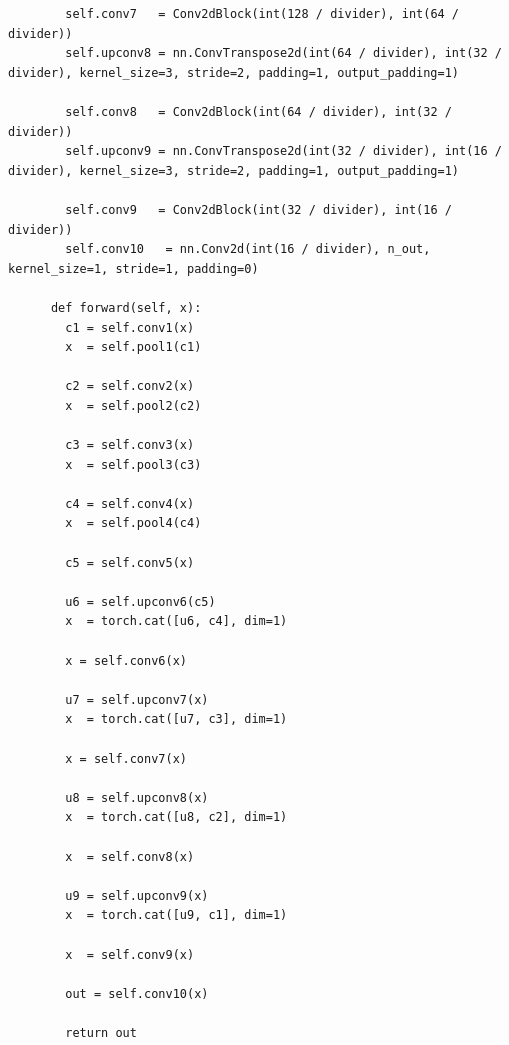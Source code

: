 \begin{longlisting}
\begin{verbatim}
        self.conv7   = Conv2dBlock(int(128 / divider), int(64 / divider))
        self.upconv8 = nn.ConvTranspose2d(int(64 / divider), int(32 / divider), kernel_size=3, stride=2, padding=1, output_padding=1)

        self.conv8   = Conv2dBlock(int(64 / divider), int(32 / divider))
        self.upconv9 = nn.ConvTranspose2d(int(32 / divider), int(16 / divider), kernel_size=3, stride=2, padding=1, output_padding=1)

        self.conv9   = Conv2dBlock(int(32 / divider), int(16 / divider))
        self.conv10   = nn.Conv2d(int(16 / divider), n_out, kernel_size=1, stride=1, padding=0)

      def forward(self, x):
        c1 = self.conv1(x)
        x  = self.pool1(c1)

        c2 = self.conv2(x)
        x  = self.pool2(c2)

        c3 = self.conv3(x)
        x  = self.pool3(c3)

        c4 = self.conv4(x)
        x  = self.pool4(c4)

        c5 = self.conv5(x)

        u6 = self.upconv6(c5)
        x  = torch.cat([u6, c4], dim=1)

        x = self.conv6(x)

        u7 = self.upconv7(x)
        x  = torch.cat([u7, c3], dim=1)

        x = self.conv7(x)

        u8 = self.upconv8(x)
        x  = torch.cat([u8, c2], dim=1)

        x  = self.conv8(x)

        u9 = self.upconv9(x)
        x  = torch.cat([u9, c1], dim=1)

        x  = self.conv9(x)

        out = self.conv10(x)

        return out
  \end{verbatim}
\end{longlisting}

